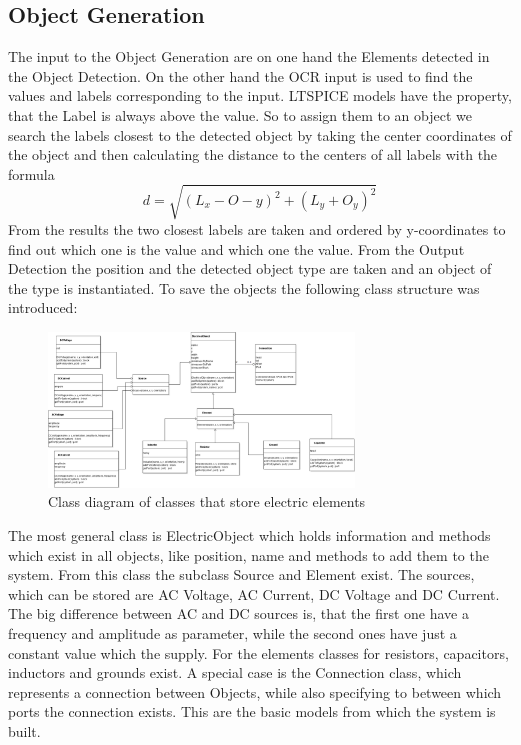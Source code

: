 \documentclass[10pt,twocolumn,letterpaper]{article}
\begin{document}
\subsection{Object Generation}
The input to the Object Generation are on one hand the Elements detected in the Object Detection. On the other hand the OCR input is used to find the values and labels corresponding to the input. LTSPICE models have the property, that the Label is always above the value. So to assign them to an object we search the labels closest to the detected object by taking the center coordinates of the object and then calculating the distance to the centers of all labels with the formula
\[
    d = \sqrt{(L_x-O-y)^2+(L_y+O_y)^2}
\]
From the results the two closest labels are taken and ordered by y-coordinates to find out which one is the value and which one the value. From the Output Detection the position and the detected object type are taken and an object of the type is instantiated. To save the objects the following class structure was introduced:
\begin{figure}[!ht]
\includegraphics[width = 3.2in]{img/class_diagram.png}
\caption{Class diagram of classes that store electric elements}
\label{fig:o1}
\end{figure}
The most general class is ElectricObject which holds information and methods which exist in all objects, like position, name and methods to add them to the system. From this class the subclass Source and Element exist. The sources, which can be stored are AC Voltage, AC Current, DC Voltage and DC Current. The big difference between AC and DC sources is, that the first one have a frequency and amplitude as parameter, while the second ones have just a constant value which the supply. For the elements classes for resistors, capacitors, inductors and grounds exist. A special case is the Connection class, which represents a connection between Objects, while also specifying to between which ports the connection exists. This are the basic models from which the system is built.
\end{document}

